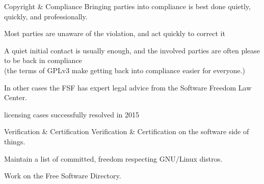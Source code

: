 \documentclass[
  size=12pt,
  style=simple,
  paper=screen
]{powerdot}
\begin{document}
\begin{wideslide}{Copyright \& Compliance}
  Bringing parties into compliance is best done quietly, quickly, and
  professionally.

  \pp

  \begin{itemize}
    \setlength{\itemsep}{1em}

    \nitem Most parties are unaware of the violation, and act quickly
    to correct it

    \pp

    \nitem A quiet initial contact is usually enough, and the involved
    parties are often please to be back in compliance\pp \\ (the terms of
    GPLv3 make getting back into compliance easier for everyone.)

    \pp

    \nitem In other cases the FSF has expert legal advice from the
    Software Freedom Law Center.

    \pp

     licensing cases successfully resolved in 2015

  \end{itemize}
\end{wideslide}

\begin{wideslide}{Verification \& Certification}
  Verification \& Certification on the software side of things.
  \pp

  \begin{itemize}
    \setlength{\itemsep}{1em}

    \nitem Maintain a list of committed, freedom respecting GNU/Linux
    distros.

    \pp

    \nitem Work on the Free Software Directory.

  \end{itemize}
\end{wideslide}
\end{document}
